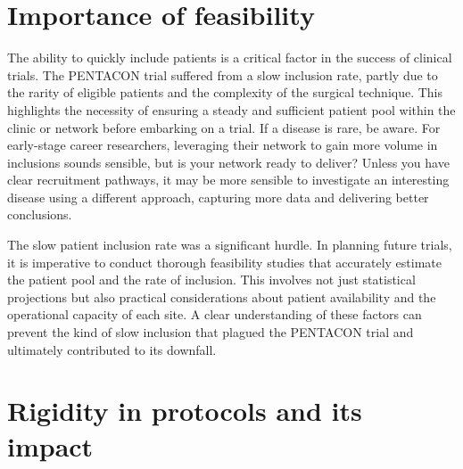 \documentclass[authordate, reflection,issue]{jote-new-article}
\begin{document}
	\section{Importance of feasibility }



	The ability to quickly include patients is a critical factor in the success of clinical trials. The PENTACON trial suffered from a slow inclusion rate, partly due to the rarity of eligible patients and the complexity of the surgical technique. This highlights the necessity of ensuring a steady and sufficient patient pool within the clinic or network before embarking on a trial. If a disease is rare, be aware. For early-stage career researchers, leveraging their network to gain more volume in inclusions sounds sensible, but is your network ready to deliver? Unless you have clear recruitment pathways, it may be more sensible to investigate an interesting disease using a different approach, capturing more data and delivering better conclusions.



	The slow patient inclusion rate was a significant hurdle. In planning future trials, it is imperative to conduct thorough feasibility studies that accurately estimate the patient pool and the rate of inclusion. This involves not just statistical projections but also practical considerations about patient availability and the operational capacity of each site. A clear understanding of these factors can prevent the kind of slow inclusion that plagued the PENTACON trial and ultimately contributed to its downfall.



	\section{Rigidity in protocols and its impact}
\end{document}
